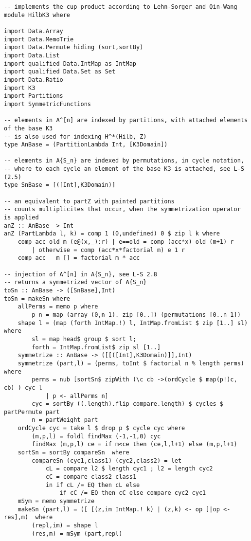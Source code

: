 \begin{lstlisting}
-- implements the cup product according to Lehn-Sorger and Qin-Wang
module HilbK3 where

import Data.Array
import Data.MemoTrie
import Data.Permute hiding (sort,sortBy)
import Data.List
import qualified Data.IntMap as IntMap
import qualified Data.Set as Set
import Data.Ratio
import K3
import Partitions
import SymmetricFunctions

-- elements in A^[n] are indexed by partitions, with attached elements of the base K3
-- is also used for indexing H^*(Hilb, Z)
type AnBase = (PartitionLambda Int, [K3Domain])

-- elements in A{S_n} are indexed by permutations, in cycle notation,
-- where to each cycle an element of the base K3 is attached, see L-S (2.5)
type SnBase = [([Int],K3Domain)]

-- an equivalent to partZ with painted partitions
-- counts multiplicites that occur, when the symmetrization operator is applied
anZ :: AnBase -> Int
anZ (PartLambda l, k) = comp 1 (0,undefined) 0 $ zip l k where
	comp acc old m (e@(x,_):r) | e==old = comp (acc*x) old (m+1) r
		| otherwise = comp (acc*x*factorial m) e 1 r
	comp acc _ m [] = factorial m * acc

-- injection of A^[n] in A{S_n}, see L-S 2.8
-- returns a symmetrized vector of A{S_n}
toSn :: AnBase -> ([SnBase],Int)
toSn = makeSn where
	allPerms = memo p where 
		p n = map (array (0,n-1). zip [0..]) (permutations [0..n-1]) 
	shape l = (map (forth IntMap.!) l, IntMap.fromList $ zip [1..] sl) where
		sl = map head$ group $ sort l; 
		forth = IntMap.fromList$ zip sl [1..]
	symmetrize :: AnBase -> ([[([Int],K3Domain)]],Int)
	symmetrize (part,l) = (perms, toInt $ factorial n % length perms)  where 
		perms = nub [sortSn$ zipWith (\c cb ->(ordCycle $ map(p!)c, cb) ) cyc l 
			| p <- allPerms n]
		cyc = sortBy ((.length).flip compare.length) $ cycles $ partPermute part
		n = partWeight part
	ordCycle cyc = take l $ drop p $ cycle cyc where
		(m,p,l) = foldl findMax (-1,-1,0) cyc
		findMax (m,p,l) ce = if m<ce then (ce,l,l+1) else (m,p,l+1)
	sortSn = sortBy	compareSn  where
		compareSn (cyc1,class1) (cyc2,class2) = let
			cL = compare l2 $ length cyc1 ; l2 = length cyc2
			cC = compare class2 class1
			in if cL /= EQ then cL else 
				if cC /= EQ then cC else compare cyc2 cyc1  
	mSym = memo symmetrize
	makeSn (part,l) = ([ [(z,im IntMap.! k) | (z,k) <- op ]|op <- res],m)  where
		(repl,im) = shape l
		(res,m) = mSym (part,repl)


\end{lstlisting}
